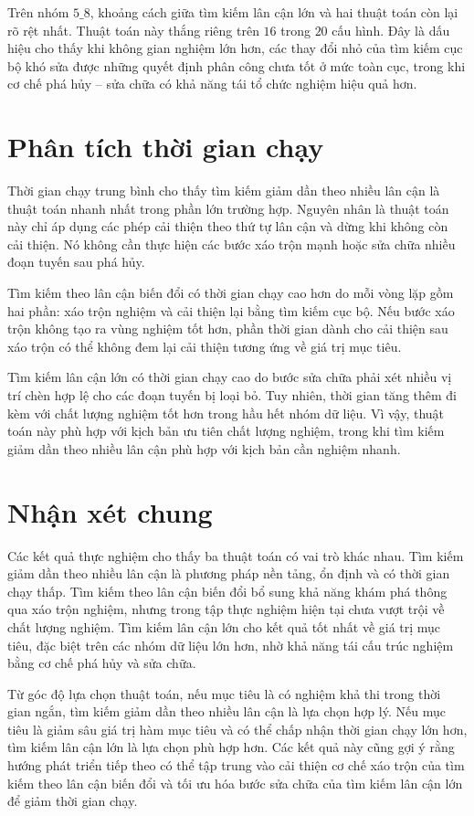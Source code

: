 Trên nhóm $5\_8$, khoảng cách giữa tìm kiếm lân cận lớn và hai thuật toán còn lại rõ rệt nhất. Thuật toán này thắng riêng trên $16$ trong $20$ cấu hình. Đây là dấu hiệu cho thấy khi không gian nghiệm lớn hơn, các thay đổi nhỏ của tìm kiếm cục bộ khó sửa được những quyết định phân công chưa tốt ở mức toàn cục, trong khi cơ chế phá hủy -- sửa chữa có khả năng tái tổ chức nghiệm hiệu quả hơn.

\section{Phân tích thời gian chạy}

Thời gian chạy trung bình cho thấy tìm kiếm giảm dần theo nhiều lân cận là thuật toán nhanh nhất trong phần lớn trường hợp. Nguyên nhân là thuật toán này chỉ áp dụng các phép cải thiện theo thứ tự lân cận và dừng khi không còn cải thiện. Nó không cần thực hiện các bước xáo trộn mạnh hoặc sửa chữa nhiều đoạn tuyến sau phá hủy.

Tìm kiếm theo lân cận biến đổi có thời gian chạy cao hơn do mỗi vòng lặp gồm hai phần: xáo trộn nghiệm và cải thiện lại bằng tìm kiếm cục bộ. Nếu bước xáo trộn không tạo ra vùng nghiệm tốt hơn, phần thời gian dành cho cải thiện sau xáo trộn có thể không đem lại cải thiện tương ứng về giá trị mục tiêu.

Tìm kiếm lân cận lớn có thời gian chạy cao do bước sửa chữa phải xét nhiều vị trí chèn hợp lệ cho các đoạn tuyến bị loại bỏ. Tuy nhiên, thời gian tăng thêm đi kèm với chất lượng nghiệm tốt hơn trong hầu hết nhóm dữ liệu. Vì vậy, thuật toán này phù hợp với kịch bản ưu tiên chất lượng nghiệm, trong khi tìm kiếm giảm dần theo nhiều lân cận phù hợp với kịch bản cần nghiệm nhanh.

\section{Nhận xét chung}

Các kết quả thực nghiệm cho thấy ba thuật toán có vai trò khác nhau. Tìm kiếm giảm dần theo nhiều lân cận là phương pháp nền tảng, ổn định và có thời gian chạy thấp. Tìm kiếm theo lân cận biến đổi bổ sung khả năng khám phá thông qua xáo trộn nghiệm, nhưng trong tập thực nghiệm hiện tại chưa vượt trội về chất lượng nghiệm. Tìm kiếm lân cận lớn cho kết quả tốt nhất về giá trị mục tiêu, đặc biệt trên các nhóm dữ liệu lớn hơn, nhờ khả năng tái cấu trúc nghiệm bằng cơ chế phá hủy và sửa chữa.

Từ góc độ lựa chọn thuật toán, nếu mục tiêu là có nghiệm khả thi trong thời gian ngắn, tìm kiếm giảm dần theo nhiều lân cận là lựa chọn hợp lý. Nếu mục tiêu là giảm sâu giá trị hàm mục tiêu và có thể chấp nhận thời gian chạy lớn hơn, tìm kiếm lân cận lớn là lựa chọn phù hợp hơn. Các kết quả này cũng gợi ý rằng hướng phát triển tiếp theo có thể tập trung vào cải thiện cơ chế xáo trộn của tìm kiếm theo lân cận biến đổi và tối ưu hóa bước sửa chữa của tìm kiếm lân cận lớn để giảm thời gian chạy.
